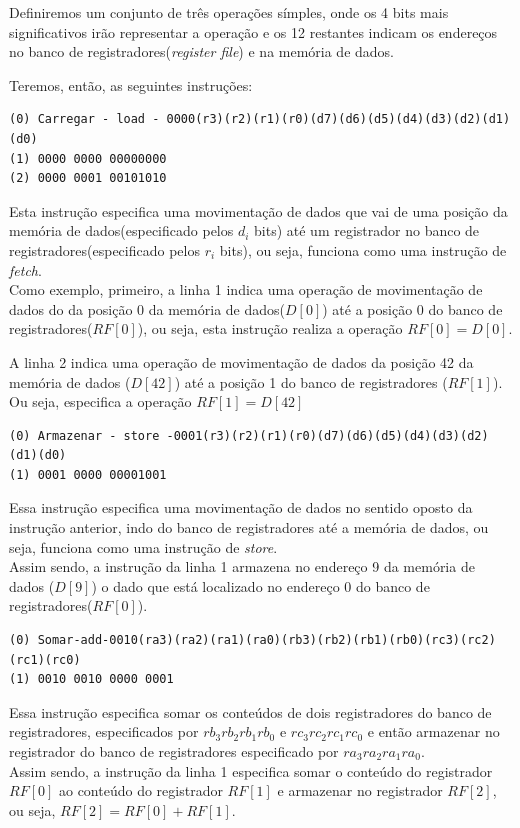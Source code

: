 \documentclass{article}
\begin{document}
Definiremos um conjunto de três operações símples, onde os 4 bits mais significativos irão representar a operação e os 12 restantes indicam os endereços no banco de registradores(\textit{register file}) e na memória de dados.

Teremos, então, as seguintes instruções:


\begin{boxedd}
\begin{lstlisting}
(0) Carregar - load - 0000(r3)(r2)(r1)(r0)(d7)(d6)(d5)(d4)(d3)(d2)(d1)(d0)
(1) 0000 0000 00000000
(2) 0000 0001 00101010
\end{lstlisting}    
Esta instrução especifica uma movimentação de dados que vai de uma posição da memória de dados(especificado pelos $d_i$ bits) até um registrador no banco de registradores(especificado pelos $r_i$ bits), ou seja, funciona como uma instrução de \textit{fetch}.\\
Como exemplo, primeiro, a linha 1 indica uma operação de movimentação de dados do da posição 0 da memória de dados($D[0]$) até a posição 0 do banco de registradores($RF[0]$), ou seja, esta instrução realiza a operação $RF[0]=D[0]$. 

A linha 2 indica uma operação de movimentação de dados da posição 42 da memória de dados ($D[42]$) até a posição 1 do banco de registradores ($RF[1]$). Ou seja, especifica a operação $RF[1]=D[42]$
\end{boxedd}
 

\begin{boxedd}
\begin{lstlisting}
(0) Armazenar - store -0001(r3)(r2)(r1)(r0)(d7)(d6)(d5)(d4)(d3)(d2)(d1)(d0)
(1) 0001 0000 00001001
\end{lstlisting}    
Essa instrução especifica uma movimentação de dados no sentido oposto da instrução anterior, indo do banco de registradores até a memória de dados, ou seja, funciona como uma instrução de \textit{store}. \\
Assim sendo, a instrução da linha 1 armazena no endereço 9 da memória de dados ($D[9]$) o dado que está localizado no endereço 0 do banco de registradores($RF[0]$).
\end{boxedd}
 
\begin{boxedd}
\begin{lstlisting}
(0) Somar-add-0010(ra3)(ra2)(ra1)(ra0)(rb3)(rb2)(rb1)(rb0)(rc3)(rc2)(rc1)(rc0)
(1) 0010 0010 0000 0001
\end{lstlisting}    
Essa instrução especifica somar os conteúdos de dois registradores do banco de registradores, especificados por $rb_3 rb_2 rb_1 rb_0$ e $rc_3 rc_2 rc_1 rc_0$ e então armazenar no registrador do banco de registradores especificado por $ra_3 ra_2 ra_1 ra_0$.\\
Assim sendo, a instrução da linha 1 especifica somar o conteúdo do registrador $RF[0]$ ao conteúdo do registrador $RF[1]$ e armazenar no registrador $RF[2]$, ou seja, $RF[2] = RF[0] + RF[1]$.
\end{boxedd}
\end{document}
